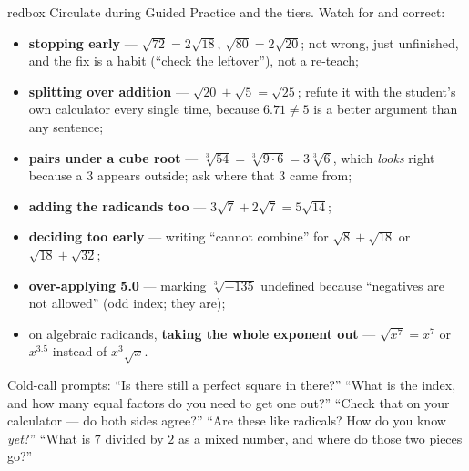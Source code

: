 \documentclass[10pt]{article}
\begin{document}
\begin{skillbox}{redbox}
Circulate during Guided Practice and the tiers. Watch for and correct:
\begin{itemize}[leftmargin=1.2em, nosep]
  \item \textbf{stopping early} --- $\sqrt{72}=2\sqrt{18}$, $\sqrt{80}=2\sqrt{20}$; not wrong, just unfinished, and the fix is a habit (``check the leftover''), not a re-teach;
  \item \textbf{splitting over addition} --- $\sqrt{20}+\sqrt5=\sqrt{25}$; refute it with the student's own calculator every single time, because $6.71\ne5$ is a better argument than any sentence;
  \item \textbf{pairs under a cube root} --- $\sqrt[3]{54}=\sqrt[3]{9\cdot6}=3\sqrt[3]{6}$, which \emph{looks} right because a $3$ appears outside; ask where that $3$ came from;
  \item \textbf{adding the radicands too} --- $3\sqrt7+2\sqrt7=5\sqrt{14}$;
  \item \textbf{deciding too early} --- writing ``cannot combine'' for $\sqrt8+\sqrt{18}$ or $\sqrt{18}+\sqrt{32}$;
  \item \textbf{over-applying 5.0} --- marking $\sqrt[3]{-135}$ undefined because ``negatives are not allowed'' (odd index; they are);
  \item on algebraic radicands, \textbf{taking the whole exponent out} --- $\sqrt{x^{7}}=x^{7}$ or $x^{3.5}$ instead of $x^{3}\sqrt x$.
\end{itemize}
Cold-call prompts: ``Is there still a perfect square in there?'' ``What is the index, and how many
equal factors do you need to get one out?'' ``Check that on your calculator --- do both sides
agree?'' ``Are these like radicals? How do you know \emph{yet}?'' ``What is $7$ divided by $2$ as a
mixed number, and where do those two pieces go?''
\end{skillbox}
\end{document}

